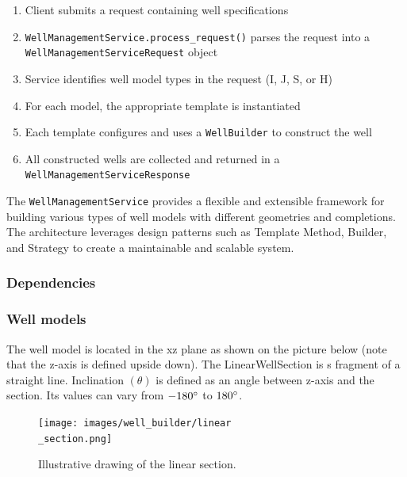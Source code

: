 \begin{enumerate}
	\item Client submits a request containing well specifications
	\item \texttt{WellManagementService.process\_request()} parses the request into a \texttt{WellManagementServiceRequest} object
	\item Service identifies well model types in the request (I, J, S, or H)
	\item For each model, the appropriate template is instantiated
	\item Each template configures and uses a \texttt{WellBuilder} to construct the well
	\item All constructed wells are collected and returned in a \texttt{WellManagementServiceResponse}
\end{enumerate}

The \texttt{WellManagementService} provides a flexible and extensible framework for building various types of well models with different geometries and completions. The architecture leverages design patterns such as Template Method, Builder, and Strategy to create a maintainable and scalable system.


\subsubsection{Dependencies}

\subsubsection{Well models}

	The well model is located in the xz plane as shown on the picture below (note that the z-axis is defined upside down). The LinearWellSection is s fragment of a straight line. Inclination $(\theta)$ is defined as an angle between z-axis and the section. Its values can vary from $-180\degree$ to $180\degree$.

	\begin{figure}[H]
		\centering
		\texttt{[image: images/well\_builder/linear\\\_section.png]}
		\caption{Illustrative drawing of the linear section.}
		\label{linear_section}
	\end{figure}

